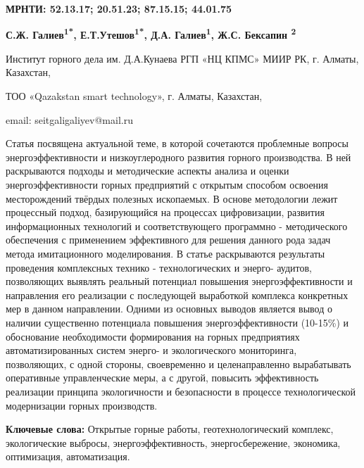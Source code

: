\clearpage
{\bfseries МРНТИ: 52.13.17; 20.51.23; 87.15.15; 44.01.75}


\begin{center}
{\bfseries С.Ж. Галиев\textsuperscript{1*}, Е.Т.Утешов\textsuperscript{1*},
Д.А. Галиев\textsuperscript{1}, Ж.С. Бексапин \textsuperscript{2}}

Институт горного дела им. Д.А.Кунаева РГП «НЦ КПМС» МИИР РК, г. Алматы,
Казахстан,

ТОО «Qazakstan smart technology», г. Алматы, Казахстан,

email: seitgaligaliyev@mail.ru
\end{center}

\hspace{1.5em} Статья посвящена актуальной теме, в которой сочетаются проблемные
вопросы энергоэффективности и низкоуглеродного развития горного
производства. В ней раскрываются подходы и методические аспекты анализа
и оценки энергоэффективности горных предприятий с открытым способом
освоения месторождений твёрдых полезных ископаемых. В основе методологии
лежит процессный подход, базирующийся на процессах цифровизации,
развития информационных технологий и соответствующего
программно - методического обеспечения с применением эффективного для
решения данного рода задач метода имитационного моделирования. В статье
раскрываются результаты проведения комплексных технико - технологических и
энерго- аудитов, позволяющих выявлять реальный потенциал повышения
энергоэффективности и направления его реализации с последующей
выработкой комплекса конкретных мер в данном направлении. Одними из
основных выводов является вывод о наличии существенно потенциала
повышения энергоэффективности (10-15\%) и обоснование необходимости
формирования на горных предприятиях автоматизированных систем энерго- и
экологического мониторинга, позволяющих, с одной стороны, своевременно и
целенаправленно вырабатывать оперативные управленческие меры, а с
другой, повысить эффективность реализации принципа экологичности и
безопасности в процессе технологической модернизации горных производств.

\hspace{1.5em} {\bfseries Ключевые слова:} Открытые горные работы, геотехнологический
комплекс, экологические выбросы, энергоэффективность, энергосбережение, экономика,
оптимизация, автоматизация.

